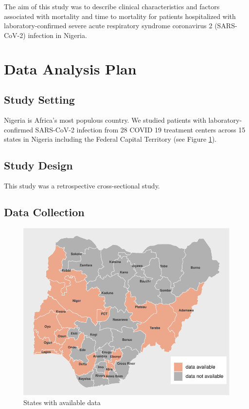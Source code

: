 \documentclass[
  10pt,
]{article}
\begin{document}
The aim of this study was to describe clinical characteristics and
factors associated with mortality and time to mortality for patients
hospitalized with laboratory-confirmed severe acute respiratory syndrome
coronavirus 2 (SARS-CoV-2) infection in Nigeria.

\hypertarget{data-analysis-plan}{%
\section{Data Analysis Plan}\label{data-analysis-plan}}

\hypertarget{study-setting}{%
\subsection{Study Setting}\label{study-setting}}

Nigeria is Africa's most populous country. We studied patients with
laboratory-confirmed SARS-CoV-2 infection from 28 COVID 19 treatment
centers across 15 states in Nigeria including the Federal Capital
Territory (see Figure \ref{fig:states-map}).

\hypertarget{study-design}{%
\subsection{Study Design}\label{study-design}}

This study was a retrospective cross-sectional study.

\hypertarget{data-collection}{%
\subsection{Data Collection}\label{data-collection}}

\begin{figure}[h!]

{\centering \includegraphics{results_files/figure-latex/states-map-1} 

}

\caption{States with available data}\label{fig:states-map}
\end{figure}
\end{document}
